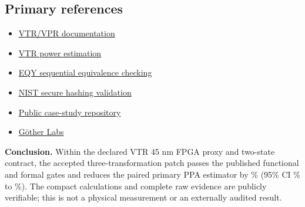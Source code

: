 \documentclass[10pt,a4paper]{article}
\begin{document}
\subsection{Primary references}
\begin{itemize}
  \item \href{https://docs.verilogtorouting.org/en/latest/vpr/}{VTR/VPR documentation}
  \item \href{https://docs.verilogtorouting.org/en/latest/vtr/power_estimation/}{VTR power estimation}
  \item \href{https://github.com/YosysHQ/eqy}{EQY sequential equivalence checking}
  \item \href{https://csrc.nist.gov/projects/cryptographic-algorithm-validation-program/secure-hashing}{NIST secure hashing validation}
  \item \href{https://github.com/juan-fernandez-gotherlabs/rtl-optimization-case-study}{Public case-study repository}
  \item \href{https://www.gotherlabs.com/}{Göther Labs}
\end{itemize}

\vspace{6mm}
\begin{claimbox}
\textbf{Conclusion.} Within the declared VTR 45 nm FPGA proxy and two-state contract, the accepted three-transformation patch passes the published functional and formal gates and reduces the paired primary PPA estimator by \CompositeEstimate\% (95\% CI \CompositeLow\% to \CompositeHigh\%). The compact calculations and complete raw evidence are publicly verifiable; this is not a physical measurement or an externally audited result.
\end{claimbox}
\end{document}
